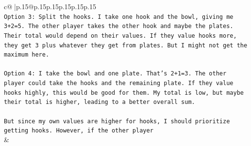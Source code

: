 \documentclass{article}
\begin{document}
{\begin{supertabular}{c@{$\;$}|p{.15\linewidth}@{}p{.15\linewidth}p{.15\linewidth}p{.15\linewidth}p{.15\linewidth}p{.15\linewidth}}
{{{\\ 
\texttt{Option 3: Split the hooks. I take one hook and the bowl, giving me 3+2=5. The other player takes the other hook and maybe the plates. Their total would depend on their values. If they value hooks more, they get 3 plus whatever they get from plates. But I might not get the maximum here.} \\
\\ 
\texttt{Option 4: I take the bowl and one plate. That's 2+1=3. The other player could take the hooks and the remaining plate. If they value hooks highly, this would be good for them. My total is low, but maybe their total is higher, leading to a better overall sum.} \\
\\ 
\texttt{But since my own values are higher for hooks, I should prioritize getting hooks. However, if the other player} \\
            }
        }
    }
    & \\ \\


\end{supertabular}}
\end{document}
